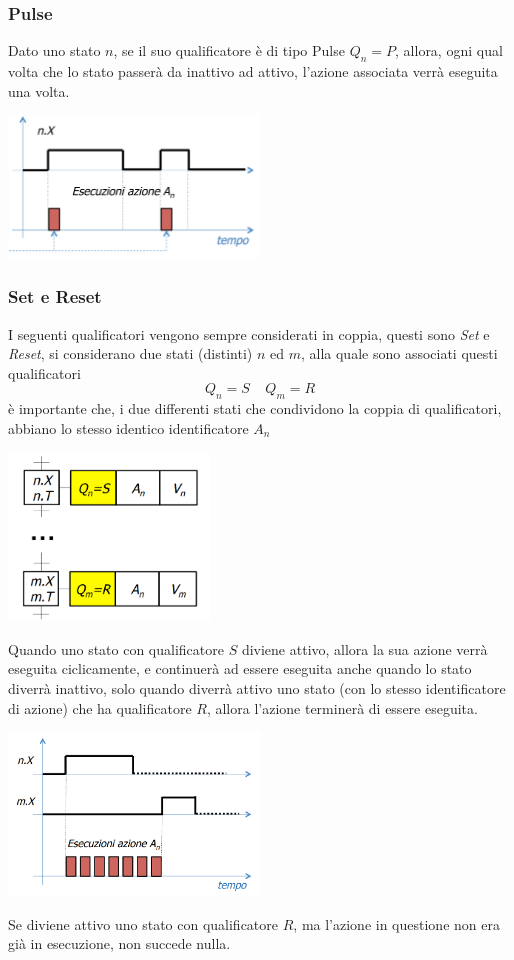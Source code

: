 \documentclass[10pt, letterpaper]{report}
\begin{document}
\subsubsection{Pulse}
Dato uno stato $n$, se il suo qualificatore è di tipo Pulse $Q_n=P$, allora, ogni qual volta che lo stato passerà da inattivo ad attivo, l'azione associata verrà eseguita una volta.
\begin{center}
    \includegraphics[width=0.5\textwidth ]{images/PulseQual.png}
\end{center}
\subsubsection{Set e Reset}
I seguenti qualificatori vengono sempre considerati in coppia, questi sono \textit{Set} e \textit{Reset}, si considerano due stati (distinti) $n$ ed $m$, alla quale sono associati questi qualificatori  $$Q_n=S \ \ \ \ \ Q_m=R $$
è importante che, i due differenti stati che condividono la coppia di qualificatori, abbiano lo stesso identico identificatore $A_n$
\begin{center}
    \includegraphics[width=0.4\textwidth ]{images/SetReset.png}
\end{center}
Quando uno stato con qualificatore $S$ diviene attivo, allora la sua azione verrà eseguita ciclicamente, e continuerà ad essere eseguita anche quando lo stato diverrà inattivo, solo quando diverrà attivo uno stato (con lo stesso identificatore di azione) che ha qualificatore $R$, allora l'azione terminerà di essere eseguita.
\begin{center}
    \includegraphics[width=0.5\textwidth ]{images/SetResetQual.png}
\end{center}
Se diviene attivo uno stato con qualificatore $R$, ma l'azione in questione non era già in esecuzione, non succede nulla.
\end{document}
